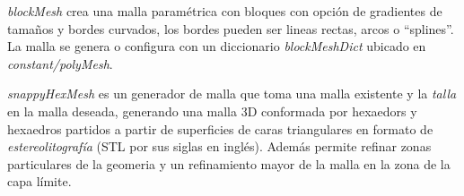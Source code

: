 \emph{blockMesh} crea una malla paramétrica con bloques con opción de gradientes
de tamaños y bordes curvados, los bordes pueden ser lineas rectas, arcos o
``splines''.
%
La malla se genera o configura con un diccionario \emph{blockMeshDict} ubicado
en \emph{constant/polyMesh}.

\emph{snappyHexMesh} es un generador de malla que toma una malla existente y la
\emph{talla} en la malla deseada, generando una malla 3D conformada por
hexaedors y hexaedros partidos a partir de superficies de caras triangulares en
formato de \emph{estereolitografía} (STL por sus siglas en inglés).
%
Además permite refinar zonas particulares de la geomeria y un refinamiento mayor
de la malla en la zona de la capa límite.









